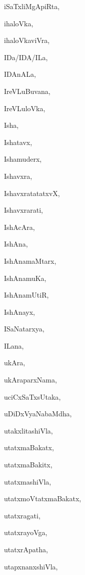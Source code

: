 \begin{multicols}{2}
{iSaTxliMgApiRta}, \pageref{iSaTxliMgApiRta}

{ihaloVka}, \pageref{ihaloVka}

{ihaloVkaviVra}, \pageref{ihaloVkaviVra}

{IDa/IDA/ILa}, \pageref{IDa/IDA/ILa}

{IDAnALa}, \pageref{IDAnALa}

{IreVLuBuvana}, \pageref{IreVLuBuvana}

{IreVLuloVka}, \pageref{IreVLuloVka}

{Isha}, \pageref{Isha}

{Ishatavx}, \pageref{Ishatavx}

{Ishamuderx}, \pageref{Ishamuderx}

{Ishavxra}, \pageref{Ishavxra}

{IshavxratatatxvX}, \pageref{IshavxratatatxvX}

{Ishavxrarati}, \pageref{Ishavxrarati}

{IshAcAra}, \pageref{IshAcAra}

{IshAna}, \pageref{IshAna}

{IshAnamaMtarx}, \pageref{IshAnamaMtarx}

{IshAnamuKa}, \pageref{IshAnamuKa}

{IshAnamUtiR}, \pageref{IshAnamUtiR}

{IshAnayx}, \pageref{IshAnayx}

{ISaNatarxya}, \pageref{ISaNatarxya}

{ILana}, \pageref{ILana}

{ukAra}, \pageref{ukAra}

{ukAraparxNama}, \pageref{ukAraparxNama}

{uciCxSaTxsUtaka}, \pageref{uciCxSaTxsUtaka}

{uDiDxVyaNabaMdha}, \pageref{uDiDxVyaNabaMdha}

{utakxlitashiVla}, \pageref{utakxlitashiVla}

{utatxmaBakatx}, \pageref{utatxmaBakatx}

{utatxmaBakitx}, \pageref{utatxmaBakitx}

{utatxmashiVla}, \pageref{utatxmashiVla}

{utatxmoVtatxmaBakatx}, \pageref{utatxmoVtatxmaBakatx}

{utatxragati}, \pageref{utatxragati}

{utatxrayoVga}, \pageref{utatxrayoVga}

{utatxrApatha}, \pageref{utatxrApatha}

{utapxnanxshiVla}, \pageref{utapxnanxshiVla}


\end{multicols}
